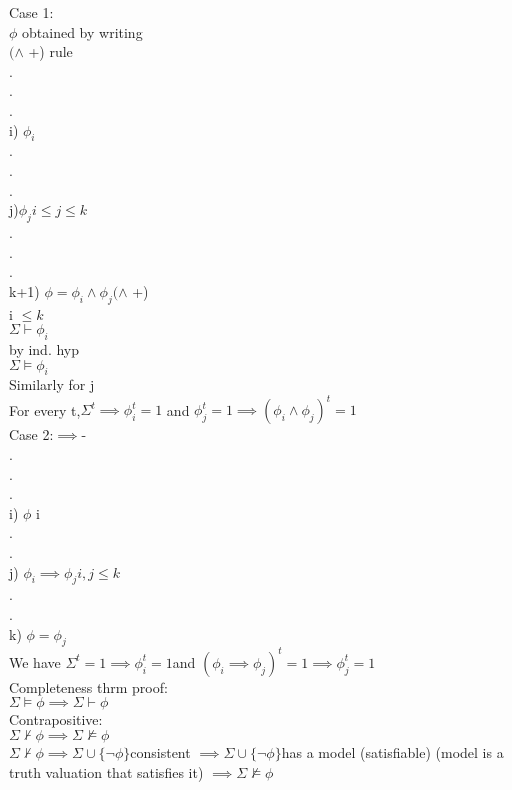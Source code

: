 \documentclass[12pt,oneside,fleqn]{article}
\theoremstyle{definition}
\begin{document}
Case 1: \\
$\phi$ obtained by writing \\
$(\land$ +) rule \\
. \\
. \\
. \\
i) $\phi_i$ \\
. \\
. \\
. \\
j)$ \phi_j  i \leq j \leq k$ \\
. \\
. \\
. \\
k+1) $\phi = \phi_i \land \phi_j (\land$ +) \\
i $\leq k$ \\
$\Sigma \vdash \phi_i$ \\
by ind. hyp \\
$\Sigma \vDash \phi_i$ \\
Similarly for j \\
For every t,$ \Sigma^t \implies \phi_i^t =1$ and $\phi_j^t = 1 \implies (\phi_i \land \phi_j)^t = 1$ \\

Case 2:$ \implies$- \\
. \\
. \\
. \\
i) $\phi$ i \\
. \\
. \\
j) $\phi_i \implies \phi_j i,j \leq k$ \\
. \\
. \\
k) $\phi = \phi_j$ \\

We have $\Sigma^t = 1 \implies \phi_i^t = 1 $and $(\phi_i \implies \phi_j)^t = 1 \implies \phi_j^t = 1$ \\
 
Completeness thrm proof: \\
$\Sigma \vDash \phi \implies \Sigma \vdash \phi$ \\
Contrapositive: \\
$\Sigma \not \vdash \phi \implies \Sigma \not \vDash \phi$ \\
 
$\Sigma \not \vdash \phi \implies \Sigma \cup \{ \neg \phi \} $consistent $\implies \Sigma \cup \{ \neg \phi \} $has a model (satisfiable) (model is a truth valuation that  satisfies it) $\implies \Sigma \not \vDash \phi$ \\
\end{document}
